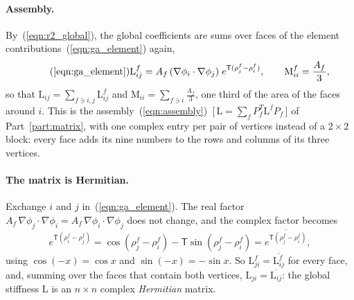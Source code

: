 \paragraph{Assembly.} By~(\ref{eqn:r2_global}), the global coefficients are sums over faces of the element contributions~(\ref{eqn:ga_element}) again,
\begin{equation*}
\tag{\ref{eqn:ga_element}}
\mathrm L^f_{ij} = A_f\, (\nabla\phi_i \cdot \nabla\phi_j)\; e^{\mathsf T (\rho_j^f - \rho_i^f)}, \qquad \mathrm M^f_{ii} = \frac{A_f}{3} ,
\end{equation*}
so that $\mathrm L_{ij} = \sum_{f\ni i, j}\mathrm L^f_{ij}$ and $\mathrm M_{ii} = \sum_{f\ni i}\frac{A_f}{3}$, one third of the area of the faces around $i$. This is the assembly~(\ref{eqn:assembly})~[\,$\mathrm L = \sum_f P_f^T\mathrm L^fP_f$\,] of Part~\ref{part:matrix}, with one complex entry per pair of vertices instead of a $2\times 2$ block: every face adds its nine numbers to the rows and columns of its three vertices.

\paragraph{The matrix is Hermitian.} Exchange $i$ and $j$ in~(\ref{eqn:ga_element}). The real factor $A_f\,\nabla\phi_j\cdot\nabla\phi_i = A_f\,\nabla\phi_i\cdot\nabla\phi_j$ does not change, and the complex factor becomes
\begin{equation*}
e^{\mathsf T(\rho_i^f - \rho_j^f)} = \cos(\rho_j^f - \rho_i^f) - \mathsf T\sin(\rho_j^f - \rho_i^f) = \overline{e^{\mathsf T(\rho_j^f - \rho_i^f)}} ,
\end{equation*}
using $\cos(-x) = \cos x$ and $\sin(-x) = -\sin x$. So $\mathrm L^f_{ji} = \overline{\mathrm L^f_{ij}}$ for every face, and, summing over the faces that contain both vertices, $\mathrm L_{ji} = \overline{\mathrm L_{ij}}$: the global stiffness $\mathrm L$ is an $n\times n$ complex \emph{Hermitian} matrix.

